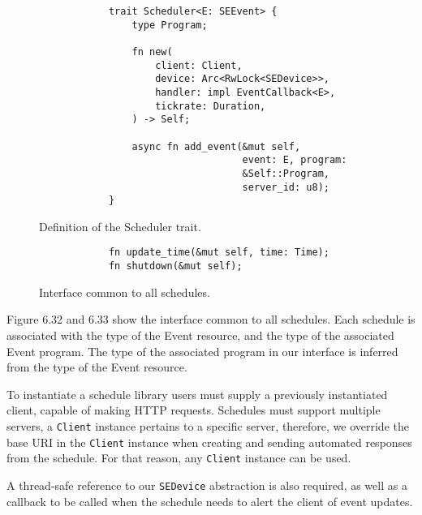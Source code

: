 \begin{figure}[h]
    \begin{center}
        \begin{lstlisting}
            trait Scheduler<E: SEEvent> {
                type Program;

                fn new(
                    client: Client,
                    device: Arc<RwLock<SEDevice>>,
                    handler: impl EventCallback<E>,
                    tickrate: Duration,
                ) -> Self;

                async fn add_event(&mut self, 
                                   event: E, program:
                                   &Self::Program, 
                                   server_id: u8);
            }
        \end{lstlisting}
        \label{fig:schedulertrait}
        \vspace{-10pt}
        \caption{Definition of the Scheduler trait.}
    \end{center}
\end{figure}

\begin{figure}[h]
    \begin{center}
        \begin{lstlisting}
            fn update_time(&mut self, time: Time);
            fn shutdown(&mut self);
        \end{lstlisting}
        \label{fig:schedulerimpl}
        \vspace{-10pt}
        \caption{Interface common to all schedules.}
    \end{center}
\end{figure}

Figure 6.32 and 6.33 show the interface common to all schedules. Each schedule is associated with the type of the Event resource, and the type of the associated Event program. The type of the associated program in our interface is inferred from the type of the Event resource.

To instantiate a schedule library users must supply a previously instantiated client, capable of making HTTP requests. Schedules must support multiple servers, a \texttt{Client} instance pertains to a specific server, therefore, we override the base URI in the \texttt{Client} instance when creating and sending automated responses from the schedule. For that reason, any \texttt{Client} instance can be used.

A thread-safe reference to our \texttt{SEDevice} abstraction is also required, as well as a callback to be called when the schedule needs to alert the client of event updates.

